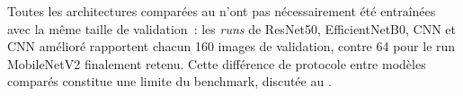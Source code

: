 Toutes les architectures compar\'ees au  n'ont pas n\'ecessairement \'et\'e entra\^in\'ees avec la m\^eme taille de validation~: les \emph{runs} de ResNet50, EfficientNetB0, CNN et CNN am\'elior\'e rapportent chacun 160 images de validation, contre 64 pour le run MobileNetV2 finalement retenu. Cette diff\'erence de protocole entre mod\`eles compar\'es constitue une limite du benchmark, discut\'ee au .
